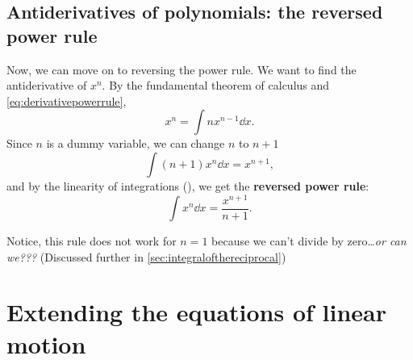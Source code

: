 \subsection{Antiderivatives of polynomials: the reversed power rule}

Now, we can move on to reversing the power rule. We want to find the antiderivative of $x^n$. By the fundamental theorem of calculus and \cref{eq:derivativepowerrule},
\begin{equation*}
    x^n = \int nx^{n - 1} \dd{x}.
\end{equation*}
Since $n$ is a dummy variable, we can change $n$ to $n + 1$
\begin{equation*}
    \int (n + 1)x^{n}\dd{x} = x^{n + 1},
\end{equation*}
and by the linearity of integrations (), we get the \textbf{reversed power rule}:
\begin{equation}
    \int x^{n}\dd{x} = \frac{x^{n + 1}}{n + 1}.
\end{equation}

Notice, this rule does not work for $n = 1$ because we can't divide by zero\dots \emph{or can we???} (Discussed further in \cref{sec:integralofthereciprocal})

\section{Extending the equations of linear motion}

